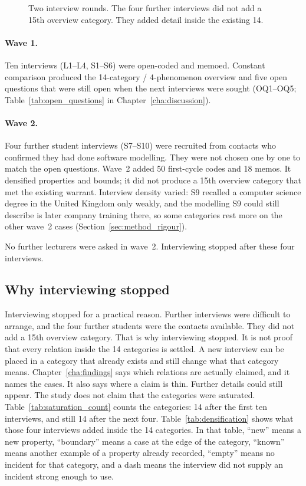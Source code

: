 \begin{figure}[htbp]
\centering

\caption{Two interview rounds. The four further interviews did not add a 15th overview category. They added detail inside the existing 14.}
\label{fig:sampling_waves}
\end{figure}

\paragraph{Wave 1.}
Ten interviews (L1--L4, S1--S6) were open-coded and memoed. Constant comparison produced the 14-category / 4-phenomenon overview and five open questions that were still open when the next interviews were sought (OQ1--OQ5; Table~\ref{tab:open_questions} in Chapter~\ref{cha:discussion}).

\paragraph{Wave 2.}
Four further student interviews (S7--S10) were recruited from contacts who confirmed they had done software modelling. They were not chosen one by one to match the open questions. Wave~2 added 50 first-cycle codes and 18 memos. It densified properties and bounds; it did not produce a 15th overview category that met the existing warrant. Interview density varied: S9 recalled a computer science degree in the United Kingdom only weakly, and the modelling S9 could still describe is later company training there, so some categories rest more on the other wave~2 cases (Section~\ref{sec:method_rigour}).

No further lecturers were asked in wave~2. Interviewing stopped after these four interviews.

\subsection{Why interviewing stopped}
\label{subsec:method_local_saturation}

Interviewing stopped for a practical reason. Further interviews were difficult to arrange, and the four further students were the contacts available. They did not add a 15th overview category. That is why interviewing stopped. It is not proof that every relation inside the 14 categories is settled. A new interview can be placed in a category that already exists and still change what that category means. Chapter~\ref{cha:findings} says which relations are actually claimed, and it names the cases. It also says where a claim is thin. Further details could still appear. The study does not claim that the categories were saturated. Table~\ref{tab:saturation_count} counts the categories: 14 after the first ten interviews, and still 14 after the next four. Table~\ref{tab:densification} shows what those four interviews added inside the 14 categories. In that table, ``new'' means a new property, ``boundary'' means a case at the edge of the category, ``known'' means another example of a property already recorded, ``empty'' means no incident for that category, and a dash means the interview did not supply an incident strong enough to use.

